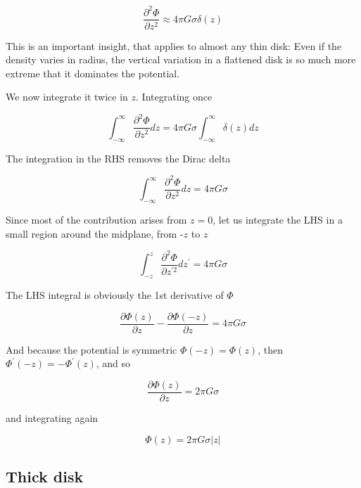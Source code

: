 \begin{equation}
\frac{\partial^2\varPhi}{\partial z^2}  \approx 4\pi G \sigma \delta(z)
\end{equation}


This is an important insight, that applies to almost any thin disk: Even if the density varies in  radius, the vertical variation in a flattened disk is so much more extreme that it dominates the potential. 

We now integrate it twice in $z$. Integrating once  

\begin{equation}
\int_{-\infty}^{\infty} \frac{\partial^2 \varPhi}{\partial z^2} dz  = 4\pi G \sigma \int_{-\infty}^\infty  \delta(z) dz
\end{equation}


The integration in the RHS removes the Dirac delta 

\begin{equation}
\int_{-\infty}^{\infty} \frac{\partial^2 \varPhi}{\partial z^2} dz  = 4\pi G \sigma 
\end{equation}


Since most of the contribution arises from $z=0$, let us integrate the LHS in a small region around the midplane, from -$z$ to $z$

\begin{equation}
\int_{-z}^{z} \frac{\partial^2 \varPhi}{\partial z^{\prime 2}} dz^\prime  = 4\pi G \sigma 
\end{equation}

The LHS integral is obviously the 1st derivative of $\varPhi$ 

\begin{equation}
\frac{\partial \varPhi(z)}{\partial z} - \frac{\partial \varPhi(-z)}{\partial z}   = 4\pi G \sigma 
\end{equation}


And because the potential is symmetric $\varPhi(-z) = \varPhi(z)$, then $\varPhi^\prime(-z) = -\varPhi^\prime(z)$, and so 

\begin{equation}
\frac{\partial \varPhi(z)}{\partial z} = 2\pi G \sigma 
\end{equation}

and integrating again 

\begin{equation}
\boxed{\varPhi(z)  = 2\pi G \sigma |z|}
\end{equation}


\subsection{Thick disk}

